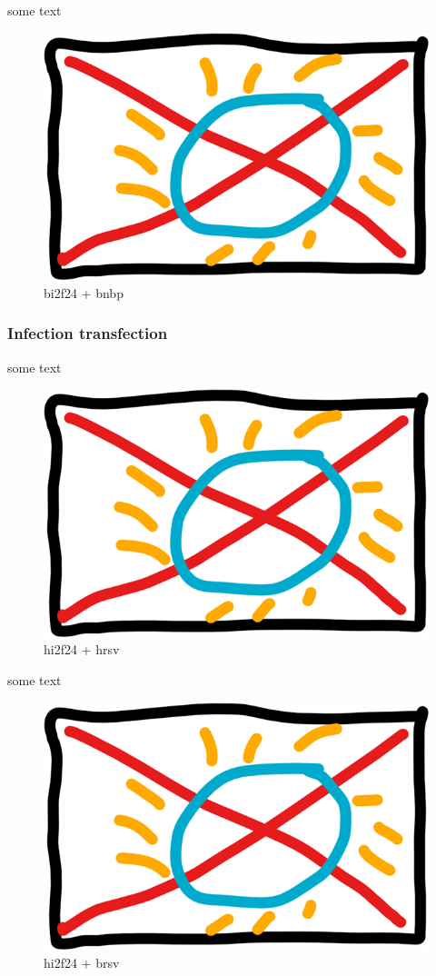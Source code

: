 some text

\begin{figure}
    \centering
    \includegraphics[width=0.5\linewidth]{10. Chapter 5//Figs//04. IFIT2-mutant confocal/00. placeholder.png}
    \caption[bi2f24 + bnbp]{bi2f24 + bnbp}
    \label{bi2f24 + bnbp}
\end{figure}


\subsubsection{Infection transfection}
some text

\begin{figure}
    \centering
    \includegraphics[width=0.5\linewidth]{10. Chapter 5//Figs//04. IFIT2-mutant confocal/00. placeholder.png}
    \caption[hi2f24 + hrsv]{hi2f24 + hrsv}
    \label{hi2f24 + hrsv}
\end{figure}


some text

\begin{figure}
    \centering
    \includegraphics[width=0.5\linewidth]{10. Chapter 5//Figs//04. IFIT2-mutant confocal/00. placeholder.png}
    \caption[hi2f24 + brsv]{hi2f24 + brsv}
    \label{hi2f24 + brsv}
\end{figure}

